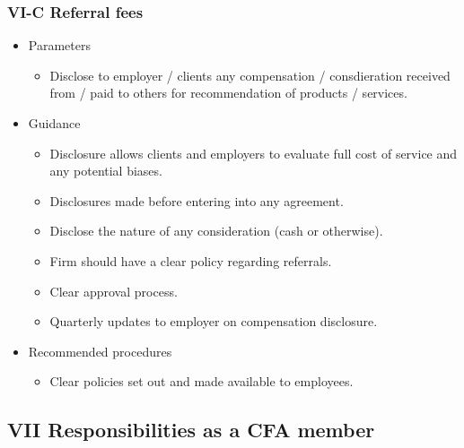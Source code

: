 \documentclass[../notes_compiled.tex]{subfiles}
\begin{document}
\subsubsection{VI-C Referral fees}
\begin{itemize}
\item Parameters
\begin{itemize}
\item Disclose to employer / clients any compensation / consdieration received from / paid to others for recommendation of products / services.
\end{itemize}
\item Guidance
\begin{itemize}
\item Disclosure allows clients and employers to evaluate full cost of service and any potential biases.
\item Disclosures made before entering into any agreement.
\item Disclose the nature of any consideration (cash or otherwise).
\item Firm should have a clear policy regarding referrals.
\item Clear approval process.
\item Quarterly updates to employer on compensation disclosure.
\end{itemize}
\item Recommended procedures
\begin{itemize}
\item Clear policies set out and made available to employees.
\end{itemize}
\end{itemize}
\subsection{VII Responsibilities as a CFA member}
\end{document}
